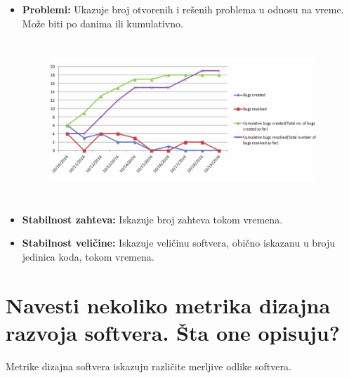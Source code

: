 \documentclass[a4paper]{article}
\begin{document}
\begin{itemize}
\begin{figure}[H]
\begin{center}
      \end{center}
    \end{figure}
    \item \textbf{Problemi:} Ukazuje broj otvorenih i rešenih problema u odnosu na vreme.
          Može biti po danima ili kumulativno.
    \begin{figure}[H]
      \begin{center}
          \includegraphics[width=100mm,height=60mm]{Slike/problemi.png}
      \end{center}
    \end{figure}
    \item \textbf{Stabilnost zahteva:} Iskazuje broj zahteva tokom vremena.
    \item \textbf{Stabilnost veličine:} Iskazuje veličinu softvera, obično iskazanu u 
          broju jedinica koda, tokom vremena.
  \end{itemize}
  
\section{Navesti nekoliko metrika dizajna razvoja softvera. Šta one opisuju?}
  
  Metrike dizajna softvera iskazuju različite merljive odlike softvera.\\
  
\end{document}

